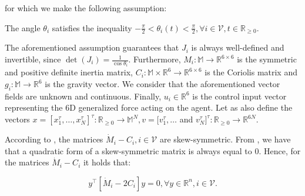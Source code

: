 for which we make the following assumption:

\begin{assumption} \label{as:J}
	The angle $\theta_i$ satisfies the inequality
  $-\frac{\pi}{2} < \theta_i(t) < \frac{\pi}{2} ,\forall i\in\mathcal{V},t\in\mathbb{R}_{\geq 0}$.
\end{assumption}

The aforementioned assumption guarantees that $J_i$ is always well-defined and
invertible, since $\det(J_i) = \tfrac{1}{\cos\theta_i}$.
Furthermore, $M_i:\mathbb{M} \to \mathbb{R}^{6\times6}$ is the symmetric and
positive definite inertia matrix,
$C_i:\mathbb{M}\times\mathbb{R}^6 \to \mathbb{R}^{6\times6}$ is the Coriolis
matrix and $g_i:\mathbb{M} \to \mathbb{R}^6$ is the gravity vector.
We consider that the aforementioned vector fields are unknown and continuous.
Finally, $u_i\in\mathbb{R}^6$ is the control input vector representing the $6$D
generalized force acting on the agent. Let as also define the vectors
$x = [x_1^\tau,\dots,x_N^\tau]^\tau : \mathbb{R}_{\geq 0} \to \mathbb{M}^N, v = [v_1^\tau, \dots$
and $v_N^\tau]^\tau : \mathbb{R}_{\geq 0} \to \mathbb{R}^{6N}$.

\begin{remark}
	According to \cite{Siciliano2009}, the matrices
  $\dot{M}_i-C_i, i \in \mathcal{V}$ are skew-symmetric.
  From \cite{horn_jonshon}, we have that a quadratic form of a skew-symmetric
  matrix is always equal to $0$. Hence, for the matrices $\dot{M}_i-C_i$ it
  holds that:

	\begin{equation} \label{eq:skew_symm}
	y^\top \left[\dot{M}_i - 2 C_i\right]y = 0, \forall y \in \mathbb{R}^n, i \in \mathcal{V}.
	\end{equation}

\end{remark}

